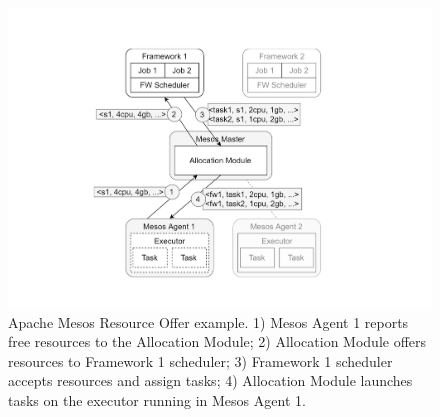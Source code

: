 \begin{figure}[t]
	\vspace{-1.5cm}
	\centering
	\includegraphics[width=\columnwidth]{Images/apache_mesos_resource_offer_example.pdf}  
	\vspace{-1cm}
	\caption[Apache Mesos Resource Offer Example]{Apache Mesos Resource Offer example. 1) Mesos Agent 1 reports
		free resources to the Allocation Module; 2) Allocation
		Module offers resources to Framework 1 scheduler; 3) Framework
		1 scheduler accepts resources and assign tasks; 4) Allocation
		Module launches tasks on the executor running in Mesos
		Agent 1.}
	\label{fig:apacheMesosResourceOfferExample}
\end{figure}

